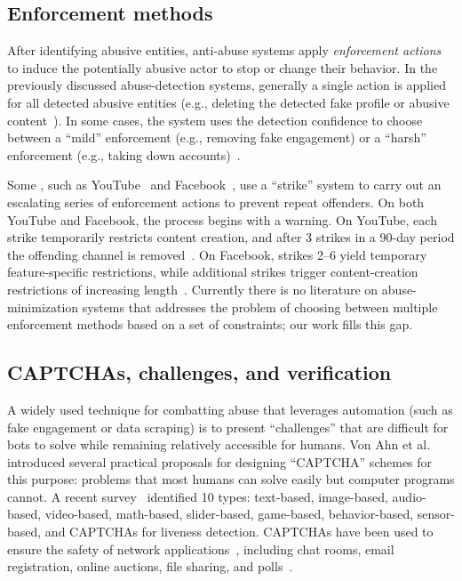 \subsection{Enforcement methods}\label{sec:bg_enforcements}

After identifying abusive entities, anti-abuse systems apply {\em enforcement actions} to induce the potentially abusive actor to stop or change their behavior. In the previously discussed abuse-detection systems, generally a single action is applied for all detected abusive entities (e.g., deleting the detected fake profile or abusive content~\cite{acm2010}). In some cases, the system uses the detection confidence to choose between a ``mild'' enforcement (e.g., removing fake engagement) or a ``harsh'' enforcement (e.g., taking down accounts)~\cite{WWW2016}.

Some \osns, such as YouTube~\cite{youtube} and Facebook~\cite{meta}, use a ``strike'' system to carry out an escalating series of enforcement actions to prevent repeat offenders. On both YouTube and Facebook, the process begins with a warning. On YouTube, each strike temporarily restricts content creation, and after 3 strikes in a 90-day period the offending channel is removed~\cite{youtube}.
On Facebook, strikes 2--6 yield temporary feature-specific restrictions, while additional strikes trigger content-creation restrictions of increasing length~\cite{meta}. 
Currently there is no literature on abuse-minimization systems that addresses the problem of choosing between multiple enforcement methods based on a set of constraints; our work fills this gap.

\subsection{CAPTCHAs, challenges, and verification}

A widely used technique for combatting abuse that leverages automation (such as fake engagement or data scraping) is to present ``challenges'' that are difficult for bots to solve while remaining relatively accessible for humans. Von Ahn et al.~\cite{von2003captcha} introduced several practical proposals for designing ``CAPTCHA'' schemes for this purpose: problems that most humans can solve easily but computer programs cannot. A recent survey~\cite{guerar2021gotta} identified 10 types: text-based, image-based, audio-based, video-based, math-based, slider-based, game-based, behavior-based, sensor-based, and CAPTCHAs for liveness detection. CAPTCHAs have been used to ensure the safety of network applications~\cite{banday2011study, longe2009checking}, including chat rooms, email registration, online auctions, file sharing, and polls~\cite{pope2005human}.

